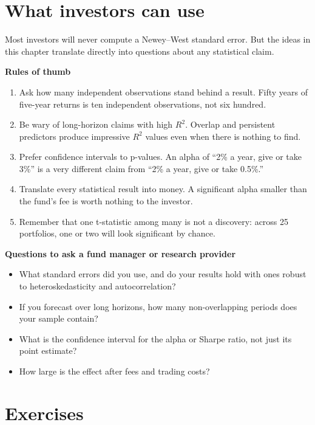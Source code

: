 \section{What investors can use}
\label{sec:03-investors}

Most investors will never compute a Newey--West standard error. But the ideas in this chapter translate directly into questions about any statistical claim.

\textbf{Rules of thumb}

\begin{enumerate}
  \item Ask how many independent observations stand behind a result. Fifty years of five-year returns is ten independent observations, not six hundred.
  \item Be wary of long-horizon claims with high $R^2$. Overlap and persistent predictors produce impressive $R^2$ values even when there is nothing to find.
  \item Prefer confidence intervals to p-values. An alpha of ``2\% a year, give or take 3\%'' is a very different claim from ``2\% a year, give or take 0.5\%.''
  \item Translate every statistical result into money. A significant alpha smaller than the fund's fee is worth nothing to the investor.
  \item Remember that one t-statistic among many is not a discovery: across 25 portfolios, one or two will look significant by chance.
\end{enumerate}

\textbf{Questions to ask a fund manager or research provider}

\begin{itemize}
  \item What standard errors did you use, and do your results hold with ones robust to heteroskedasticity and autocorrelation?
  \item If you forecast over long horizons, how many non-overlapping periods does your sample contain?
  \item What is the confidence interval for the alpha or Sharpe ratio, not just its point estimate?
  \item How large is the effect after fees and trading costs?
\end{itemize}

\section*{Exercises}

